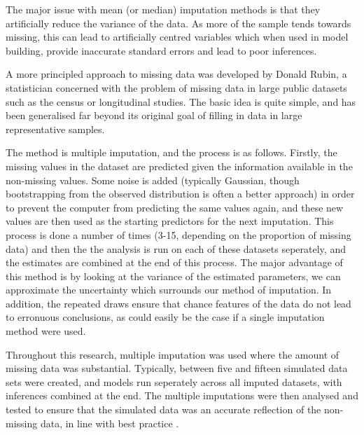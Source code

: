 The major issue with mean (or median) imputation methods is that they artificially reduce the variance of the data. As more of the sample tends towards missing, this can lead to artificially centred variables which when used in model building, provide inaccurate standard errors and lead to poor inferences.

A more principled approach to missing data was developed by Donald Rubin, a statistician concerned with the problem of missing data in large public datasets such as the census or longitudinal studies\cite{little1987statistical}. The basic idea is quite simple, and has been generalised far beyond its original goal of filling in data in large representative samples.

The method is multiple imputation, and the process is as follows. Firstly, the missing values in the dataset are predicted given the information available in the non-missing values. Some noise is added (typically Gaussian, though bootstrapping from the observed distribution is often a better approach) \cite{gelman2007data} in order to prevent the computer from predicting the same values again, and these new values are then used as the starting predictors for the next imputation. This process is done a number of times (3-15, depending on the proportion of missing data) \cite{graham2009missing,little1987statistical} and then the the analysis is run on each of these datasets seperately, and the estimates are combined at the end of this process. The major advantage of this method is by looking at the variance of the estimated parameters, we can approximate the uncertainty which surrounds our method of imputation. In addition, the repeated draws ensure that chance features of the data do not lead to erronuous conclusions, as could easily be the case if a single imputation method were used.

Throughout this research, multiple imputation was used where the amount of missing data was substantial. Typically, between five and fifteen simulated data sets were created, and models run seperately across all imputed datasets, with inferences combined at the end. The multiple imputations were then analysed and tested to ensure that the simulated data was an accurate reflection of the non-missing data, in line with best practice \cite{abayomi2008diagnostics}.


